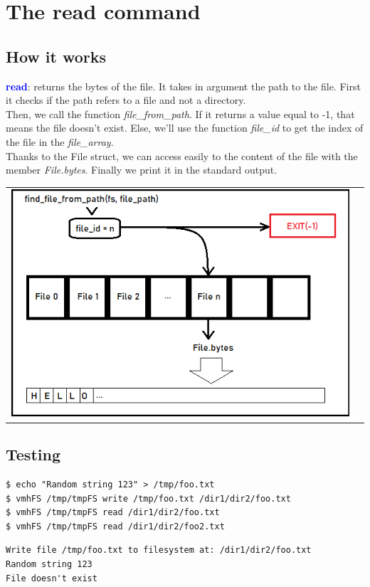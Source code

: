 \section{The read command}

\subsection{How it works}
\textcolor{blue}{\textbf{read}}: returns the bytes of the file. It takes in argument the path to the file.
First it checks if the path refers to a file and not a directory.\\

Then, we call the function \textit{file\_from\_path}. If it returns a value  equal to -1, that means the file doesn't exist. Else, we'll use the function \textit{file\_id} to get the index of the file in the \textit{file\_array}.\\

Thanks to the File struct, we can access easily to the content of the file with the member \textit{File.bytes}. Finally we print it in the standard output.\\
\begin{center}
    \begin{tabular}{cc}
        \includegraphics{figures/read.png}
    \end{tabular}
\end{center}

\newpage
\subsection{Testing}
\begin{lstlisting}
$ echo "Random string 123" > /tmp/foo.txt
$ vmhFS /tmp/tmpFS write /tmp/foo.txt /dir1/dir2/foo.txt
$ vmhFS /tmp/tmpFS read /dir1/dir2/foo.txt
$ vmhFS /tmp/tmpFS read /dir1/dir2/foo2.txt
\end{lstlisting}

\begin{lstlisting}
Write file /tmp/foo.txt to filesystem at: /dir1/dir2/foo.txt
Random string 123
File doesn't exist
\end{lstlisting}

\newpage